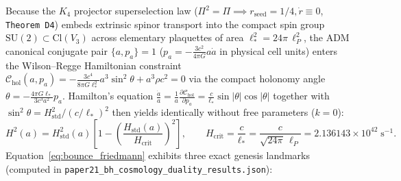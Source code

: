 \documentclass[11pt,a4paper]{article}
\theoremstyle{remark}
\begin{document}
Because the $K_4$ projector superselection law ($\Pi^2 = \Pi \implies r_{\mathrm{seed}} = 1/4, \dot{r} \equiv 0$, \texttt{Theorem D4}) embeds extrinsic spinor transport into the compact spin group $\mathrm{SU}(2) \subset \mathrm{Cl}(V_3)$ across elementary plaquettes of area $\ell_*^2 = 24\pi\,\ell_P^2$, the ADM canonical conjugate pair $\{a, p_a\} = 1$ ($p_a = -\frac{3c^2}{4\pi G}a\dot{a}$ in physical cell units) enters the Wilson--Regge Hamiltonian constraint $\mathcal{C}_{\mathrm{hol}}(a, p_a) = -\frac{3c^4}{8\pi G\ell_*^2}a^3\sin^2\theta + a^3\rho c^2 = 0$ via the compact holonomy angle $\theta = -\frac{4\pi G\ell_*}{3c^3 a^2}p_a$. Hamilton's equation $\frac{\dot{a}}{a} = \frac{1}{a}\frac{\partial\mathcal{C}_{\mathrm{hol}}}{\partial p_a} = \frac{c}{\ell_*}\sin|\theta|\cos|\theta|$ together with $\sin^2\theta = H_{\mathrm{std}}^2 / (c/\ell_*)^2$ then yields identically without free parameters ($k = 0$):
\begin{equation}
  H^2(a) = H_{\mathrm{std}}^2(a)\!\left[1 - \left(\frac{H_{\mathrm{std}}(a)}{H_{\mathrm{crit}}}\right)^2\right], \qquad H_{\mathrm{crit}} = \frac{c}{\ell_*} = \frac{c}{\sqrt{24\pi}\,\ell_P} = 2.136143 \times 10^{42}\;\mathrm{s}^{-1}.
  \label{eq:bounce_friedmann}
\end{equation}
Equation~\eqref{eq:bounce_friedmann} exhibits three exact genesis landmarks (computed in \texttt{paper21\_\allowbreak bh\_\allowbreak cosmology\_\allowbreak duality\_\allowbreak results.json}):
\end{document}
